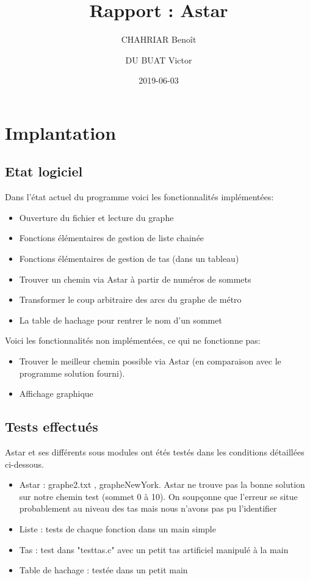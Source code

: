 \documentclass[12pt,a4paper]{article}
\title{Rapport : Astar}
\date{2019-06-03}
\author{
	CHAHRIAR Benoît
	\and
	DU BUAT Victor
}
\begin{document}
\maketitle
\section{Implantation}

        \subsection{Etat logiciel}
Dans l'état actuel du programme voici les fonctionnalités implémentées:
\begin{itemize} 
        \item Ouverture du fichier et lecture du graphe
        \item Fonctions élémentaires de gestion de liste chainée
        \item Fonctions élémentaires de gestion de tas (dans un tableau) 
        \item Trouver un chemin via Astar à partir de numéros de sommets
        \item Transformer le coup arbitraire des arcs du graphe de métro
        \item La table de hachage pour rentrer le nom d'un sommet
\end{itemize}
Voici les fonctionnalités non implémentées, ce qui ne fonctionne pas:
\begin{itemize}
        \item Trouver le meilleur chemin possible via Astar (en comparaison avec le programme solution fourni).
        \item Affichage graphique
\end{itemize}

        \subsection{Tests effectués}
Astar et ses différents sous modules ont étés testés dans les conditions détaillées ci-dessous.
\begin{itemize}
        \item Astar : graphe2.txt , grapheNewYork. Astar ne trouve pas la bonne solution sur notre chemin test (sommet 0 à 10). On soupçonne que l'erreur se situe probablement au niveau des tas mais nous n'avons pas pu l'identifier
        \item Liste : tests de chaque fonction dans un main simple 
        \item Tas : test dans "testtas.c" avec un petit tas artificiel manipulé à la main
        \item Table de hachage : testée dans un petit main 
\end{itemize}
                
\end{document}
